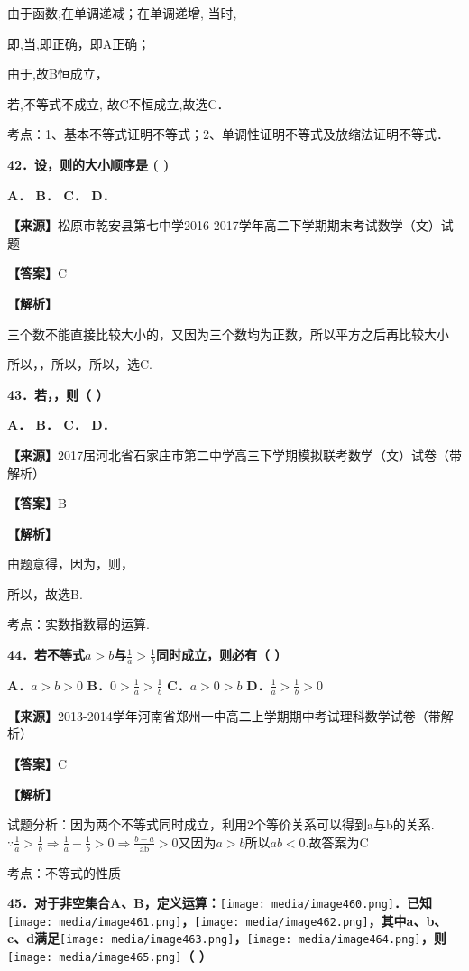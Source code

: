 由于函数,在单调递减；在单调递增, 当时,

即,当,即正确，即A正确；

由于,故B恒成立，

若,不等式不成立, 故C不恒成立,故选C．

考点：1、基本不等式证明不等式；2、单调性证明不等式及放缩法证明不等式．

\textbf{42．设，则的大小顺序是 ( )}

\textbf{A． B． C． D．}

\textbf{【来源】}松原市乾安县第七中学2016-2017学年高二下学期期末考试数学（文）试题

\textbf{【答案】}C

\textbf{【解析】}

三个数不能直接比较大小的，又因为三个数均为正数，所以平方之后再比较大小

所以，，所以，所以，选C.

\textbf{43．若，，则（ ）}

\textbf{A． B． C． D．}

\textbf{【来源】}2017届河北省石家庄市第二中学高三下学期模拟联考数学（文）试卷（带解析）

\textbf{【答案】}B

\textbf{【解析】}

由题意得，因为，则，

所以，故选B.

考点：实数指数幂的运算.

\textbf{44．若不等式}\(a > b\)\textbf{与}\(\frac{1}{a} > \frac{1}{b}\)\textbf{同时成立，则必有（
）}

\textbf{A．}\(a > b > 0\) \textbf{B．}\(0 > \frac{1}{a} > \frac{1}{b}\)
\textbf{C．}\(a > 0 > b\) \textbf{D．}\(\frac{1}{a} > \frac{1}{b} > 0\)

\textbf{【来源】}2013-2014学年河南省郑州一中高二上学期期中考试理科数学试卷（带解析）

\textbf{【答案】}C

\textbf{【解析】}

试题分析：因为两个不等式同时成立，利用2个等价关系可以得到a与b的关系.\(\because\frac{1}{a} > \frac{1}{b} \Rightarrow \frac{1}{a} - \frac{1}{b} > 0 \Rightarrow \frac{b - a}{\text{ab}} > 0\)又因为\(a > b\)所以\(ab < 0\).故答案为C

考点：不等式的性质

\textbf{45．对于非空集合A、B，定义运算：}\texttt{[image: media/image460.png]}\textbf{．已知}\texttt{[image: media/image461.png]}\textbf{，}\texttt{[image: media/image462.png]}\textbf{，其中a、b、c、d满足}\texttt{[image: media/image463.png]}\textbf{，}\texttt{[image: media/image464.png]}\textbf{，则}\texttt{[image: media/image465.png]}\textbf{（
）}

